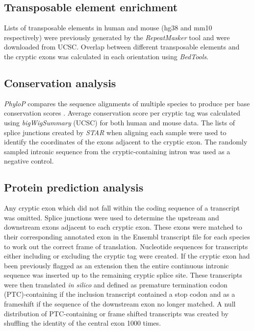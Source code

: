 \subsection{Transposable element enrichment} 
Lists of transposable elements in human and mouse (hg38 and mm10 respectively) were previously generated by the \emph{RepeatMasker} tool \citep{Smit_AFA_Hubley_R_Green_P2015-ye} and were downloaded from UCSC. Overlap between different transposable elements and the cryptic exons was calculated in each orientation using \emph{BedTools}. 

\subsection{Conservation analysis}
\textit{PhyloP} compares the sequence alignments of multiple species to produce per base conservation scores \citep{Pollard2010-fj}. Average conservation score per cryptic tag was calculated using \emph{bigWigSummary} (UCSC) for both human and mouse data. The lists of splice junctions created by \emph{STAR} when aligning each sample were used to identify the coordinates of the exons adjacent to the cryptic exon. The randomly sampled intronic sequence from the cryptic-containing intron was used as a negative control.

\subsection{Protein prediction analysis}
Any cryptic exon which did not fall within the coding sequence of a transcript was omitted. Splice junctions were used to determine the upstream and downstream exons adjacent to each cryptic exon. These exons were matched to their corresponding annotated exon in the Ensembl transcript file for each species to work out the correct frame of translation. Nucleotide sequences for transcripts either including or excluding the cryptic tag were created. If the cryptic exon had been previously flagged as an extension then the entire continuous intronic sequence was inserted up to the remaining cryptic splice site. These transcripts were then translated \textit{in silico} and defined as premature termination codon (PTC)-containing if the inclusion transcript contained a stop codon and as a frameshift if the sequence of the downstream exon no longer matched. A null distribution of PTC-containing or frame shifted transcripts was created by shuffling the identity of the central exon 1000 times. 

